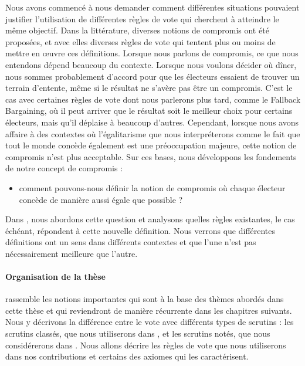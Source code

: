 	Nous avons commencé à nous demander comment différentes situations pouvaient justifier l'utilisation de différentes règles de vote qui cherchent à atteindre le même objectif.
	Dans la littérature, diverses notions de compromis ont été proposées, et avec elles diverses règles de vote qui tentent plus ou moins de mettre en œuvre ces définitions.
	Lorsque nous parlons de compromis, ce que nous entendons dépend beaucoup du contexte. Lorsque nous voulons décider où dîner, nous sommes probablement d'accord pour que les électeurs essaient de trouver un terrain d'entente, même si le résultat ne s'avère pas être un compromis. C'est le cas avec certaines règles de vote dont nous parlerons plus tard, comme le Fallback Bargaining, où il peut arriver que le résultat soit le meilleur choix pour certains électeurs, mais qu'il déplaise à beaucoup d'autres.
	Cependant, lorsque nous avons affaire à des contextes où l'égalitarisme \textemdash que nous interpréterons comme le fait que tout le monde concède également \textemdash est une préoccupation majeure, cette notion de compromis n'est plus acceptable.
	Sur ces bases, nous développons les fondements de notre concept de compromis :
	\begin{itemize}
		\item comment pouvons-nous définir la notion de compromis où chaque électeur concède de manière aussi égale que possible ?
	\end{itemize}
	Dans , nous abordons cette question et analysons quelles règles existantes, le cas échéant, répondent à cette nouvelle définition. Nous verrons que différentes définitions ont un sens dans différents contextes et que l'une n'est pas nécessairement meilleure que l'autre.
	
	\paragraph{Organisation de la thèse}
	 rassemble les notions importantes qui sont à la base des thèmes abordés dans cette thèse et qui reviendront de manière récurrente dans les chapitres suivants. Nous y décrivons la différence entre le vote avec différents types de scrutins : les scrutins classés, que nous utiliserons dans , et les scrutins notés, que nous considérerons dans . Nous allons décrire les règles de vote que nous utiliserons dans nos contributions et certains des axiomes qui les caractérisent.
	
